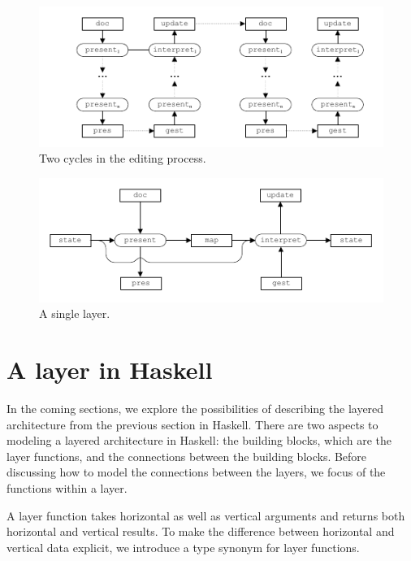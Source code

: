 \documentclass[preprint,natbib]{sigplanconf}
\begin{document}
\begin{figure}
\includegraphics[width=\columnwidth]{images/EditCycles}
\caption{Two cycles in the editing process.}\label{simpleeditprocess} 
\end{figure}



\begin{figure}
\includegraphics[width=\columnwidth]{images/SingleLayer}
\caption{A single layer.}\label{simplesinglelayer} 
\end{figure}





%																
%																
%																
\section{A layer in Haskell} \label{sect:layerInHaskell}

In the coming sections, we explore the possibilities of describing the layered architecture from the previous section in Haskell. There are two aspects to modeling a layered architecture in Haskell: the building blocks, which are the layer functions, and the connections between the building blocks. Before discussing how to model the connections between the layers, we focus of the functions within a layer.

A layer function takes  horizontal as well as vertical arguments and returns both  horizontal and vertical results. To make the difference between horizontal and vertical data explicit, we introduce a type synonym for layer functions.
\end{document}
